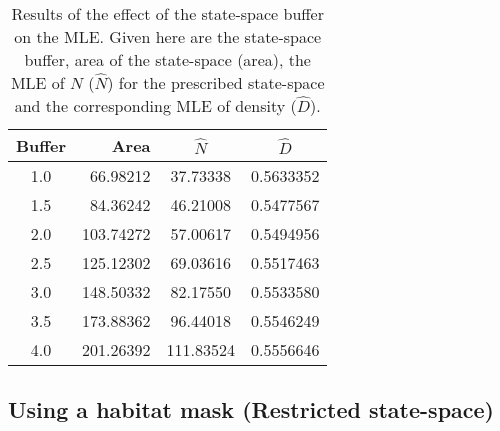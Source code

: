 \begin{table}[ht]
\centering
\caption{Results of the effect of the state-space buffer on the MLE. 
Given here are the state-space buffer, area of the state-space (area), the
MLE of $N$ ($\hat{N}$) for the prescribed state-space and the corresponding MLE of
density ($\hat{D}$).}
\begin{tabular}{crcc}
\hline \hline
Buffer   & Area & $\hat{N}$ & $\hat{D}$ \\ \hline
 1.0 & 66.98212 & 37.73338 & 0.5633352  \\
 1.5 & 84.36242 & 46.21008 & 0.5477567  \\
 2.0 &103.74272 & 57.00617 & 0.5494956  \\
 2.5 &125.12302 & 69.03616 & 0.5517463  \\
 3.0 &148.50332 & 82.17550 & 0.5533580  \\ 
 3.5 &173.88362 & 96.44018 & 0.5546249  \\
 4.0 &201.26392 &111.83524 & 0.5556646  \\  \hline
\end{tabular}
\label{mle.tab.buff}
\end{table}


\subsection{Using a habitat mask (Restricted state-space)}
\label{mle.sec.shapefile}

